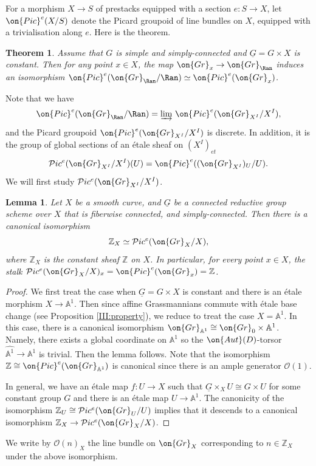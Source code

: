 \documentclass[]{pcmi}
\theoremstyle{plain}
\newtheorem{thm}[equation]{Theorem}
\newtheorem{lem}[equation]{Lemma}
\theoremstyle{remark}
\theoremstyle{definition}
\newcommand{\bA}{{\mathbb A}}
\newcommand{\bZ}{{\mathbb Z}}
\newcommand{\mO}{{\mathcal O}}
\newcommand{\mP}{{\mathcal P}}
\newcommand{\Aut}{{\on{Aut}}}
\newcommand{\Gr}{{\on{Gr}}}
\newcommand{\Pic}{{\on{Pic}}}
\begin{document}
For a morphism $X\to S$ of prestacks equipped with a section $e:S\to X$, let $\Pic^e(X/S)$ denote the Picard groupoid of line bundles on $X$, equipped with a trivialisation along $e$.
Here is the theorem.
\begin{thm}\label{Rigid line}Assume that $G$ is simple and simply-connected and $\underline G=G\times X$ is constant.
Then for any point $x\in X$, the map $\Gr_x\to \Gr_{\Ran}$ induces an isomorphism
$\Pic^e(\Gr_{\Ran}/\Ran)\simeq \Pic^e(\Gr_x)$.
\end{thm}

Note that we have
\[\Pic^e(\Gr_{\Ran}/\Ran)=\underrightarrow\lim\ \Pic^e(\Gr_{X^I}/X^I),\]
and the Picard groupoid $\Pic^e(\Gr_{X^I}/X^I)$ is discrete. In addition, it is the group of global sections of an \'etale sheaf on $(X^I)_{et}$
\[\mP ic^e(\Gr_{X^I}/X^I)(U)= \Pic^e((\Gr_{X^I})_U/U).\]
We will first study $\mP ic^e(\Gr_{X^I}/X^I)$.

\begin{lem}
Let $X$ be a smooth curve, and $\underline G$  be a connected reductive group scheme over $X$ that is fiberwise connected, and simply-connected.
Then there is a canonical isomorphism 
\[\bZ_X\simeq \mP ic^e(\Gr_X/X),\]
where $\bZ_X$ is the constant sheaf $\bZ$ on $X$.
In particular, for every point $x\in X$, the stalk $\mP ic^e(\Gr_X/X)_x=\Pic^e(\Gr_x)=\bZ$.
\end{lem}
\begin{proof}
We first treat the case when $\underline G=G\times X$ is constant and there is an \'etale morphism $X\to \bA^1$. Then since affine Grassmannians commute with \'etale base change (see Proposition \ref{III:property}), we reduce to treat the case $X=\bA^1$. In this case, there is a canonical isomorphism $\Gr_{\bA^1}\cong \Gr_0\times {\bA^1}$. Namely, there exists a global coordinate on $\bA^1$ so the $\Aut(D)$-torsor $\widehat{\bA^1}\to \bA^1$ is trivial. Then the lemma follows. Note that the isomorphism $\bZ\cong \Pic^e(\Gr_{\bA^1})$ is canonical since there is an ample generator $\mO(1)$. 

In general, we have an \'etale map $f:U\to X$ such that $\underline G\times_XU\cong G\times U$ for some constant group $G$ and there is an \'etale map $U\to \bA^1$. The canonicity of the isomorphism $\bZ_U\cong \mP ic^e(\Gr_U/U)$ implies that it descends to a canonical isomorphism $\bZ_X\to \mP ic^e(\Gr_X/X)$.
\end{proof}

We write by $\mO(n)_X$ the line bundle on $\Gr_X$ corresponding to $n\in \bZ_X$ under the above isomorphism.
\end{document}
